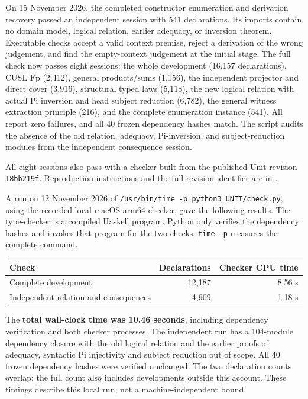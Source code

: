 \documentclass[11pt,a4paper]{article}
\theoremstyle{definition}
\theoremstyle{remark}
\begin{document}
On 15 November 2026, the completed constructor enumeration and derivation
recovery passed an independent session with 541 declarations. Its imports
contain no domain model, logical relation, earlier adequacy, or inversion
theorem. Executable checks accept a valid context premise, reject a
derivation of the wrong judgement, and find the empty-context judgement
at the initial stage. The full check now passes eight sessions:
the whole development (16,157 declarations), CUSL $\mathrm{Fp}$ (2,412),
general products/sums (1,156), the independent projector and direct cover
(3,916), structural typed laws (5,118), the new logical relation with actual
Pi inversion and head subject reduction (6,782), the general witness
extraction principle (216), and the complete enumeration instance (541).
All report zero failures, and all 40 frozen dependency hashes match.
The script audits the absence of the old relation, adequacy, Pi-inversion,
and subject-reduction modules from the independent consequence session.

All eight sessions also pass with a checker built from the published Unit
revision \texttt{18bb219f}. Reproduction instructions and the full revision
identifier are in .

A run on 12 November 2026 of
\texttt{/usr/bin/time -p python3 UNIT/check.py}, using the recorded local
macOS arm64 checker, gave the following results. The type-checker is a
compiled Haskell program. Python only verifies the dependency hashes and
invokes that program for the two checks; \texttt{time -p} measures the
complete command.
\begin{center}
\begin{tabular}{lrr}
\hline
Check & Declarations & Checker CPU time\\
\hline
Complete development & 12,187 & 8.56 s\\
Independent relation and consequences & 4,909 & 1.18 s\\
\hline
\end{tabular}
\end{center}
The \textbf{total wall-clock time was 10.46 seconds}, including dependency
verification and both checker processes. The independent run has a
104-module dependency closure with the old logical relation and the earlier
proofs of adequacy, syntactic Pi injectivity and subject reduction out of scope. All 40 frozen
dependency hashes were verified unchanged. The two declaration counts
overlap; the full count also includes developments outside this account.
These timings describe this local run, not a machine-independent bound.
\end{document}
